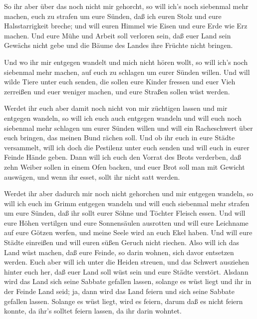  So ihr aber über das noch nicht mir gehorcht, so will
ich's noch siebenmal mehr machen, euch zu strafen um eure Sünden,
 daß ich euren Stolz und eure Halsstarrigkeit breche; und
will euren Himmel wie Eisen und eure Erde wie Erz machen. 
Und eure Mühe und Arbeit soll verloren sein, daß euer Land sein Gewächs
nicht gebe und die Bäume des Landes ihre Früchte nicht bringen.

 Und wo ihr mir entgegen wandelt und mich nicht hören
wollt, so will ich's noch siebenmal mehr machen, auf euch zu schlagen um
eurer Sünden willen.  Und will wilde Tiere unter euch
senden, die sollen eure Kinder fressen und euer Vieh zerreißen und euer
weniger machen, und eure Straßen sollen wüst werden.

 Werdet ihr euch aber damit noch nicht von mir züchtigen
lassen und mir entgegen wandeln,  so will ich euch auch
entgegen wandeln und will euch noch siebenmal mehr schlagen um eurer
Sünden willen  und will ein Racheschwert über euch bringen,
das meinen Bund rächen soll. Und ob ihr euch in eure Städte versammelt,
will ich doch die Pestilenz unter euch senden und will euch in eurer
Feinde Hände geben.  Dann will ich euch den Vorrat des
Brots verderben, daß zehn Weiber sollen in einem Ofen backen, und euer
Brot soll man mit Gewicht auswägen, und wenn ihr esset, sollt ihr nicht
satt werden.

 Werdet ihr aber dadurch mir noch nicht gehorchen und mir
entgegen wandeln,  so will ich euch im Grimm entgegen
wandeln und will euch siebenmal mehr strafen um eure Sünden,
 daß ihr sollt eurer Söhne und Töchter Fleisch essen.
 Und will eure Höhen vertilgen und eure Sonnensäulen
ausrotten und will eure Leichname auf eure Götzen werfen, und meine
Seele wird an euch Ekel haben.  Und will eure Städte
einreißen und will euren süßen Geruch nicht riechen.  Also
will ich das Land wüst machen, daß eure Feinde, so darin wohnen, sich
davor entsetzen werden.  Euch aber will ich unter die
Heiden streuen, und das Schwert ausziehen hinter euch her, daß euer Land
soll wüst sein und eure Städte verstört.  Alsdann wird das
Land sich seine Sabbate gefallen lassen, solange es wüst liegt und ihr
in der Feinde Land seid; ja, dann wird das Land feiern und sich seine
Sabbate gefallen lassen.  Solange es wüst liegt, wird es
feiern, darum daß es nicht feiern konnte, da ihr's solltet feiern
lassen, da ihr darin wohntet.

